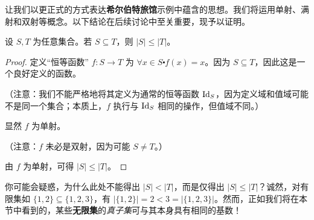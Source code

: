 让我们以更正式的方式表达\textbf{希尔伯特旅馆}示例中蕴含的思想。我们将运用单射、满射和双射等概念。以下结论在后续讨论中至关重要，现予以证明。

\begin{lemma}\label{lemma7.6.11}
    设 $S, T$ 为任意集合。若 $S \subseteq T$，则 $|S| \le |T|$。
\end{lemma}

\begin{proof}
    定义``恒等函数'' $f : S \to T$ 为 $\forall x \in S \centerdot f(x) = x$。因为 $S \subseteq T$，因此这是一个良好定义的函数。

    （注意：我们不能严格地将其定义为通常的恒等函数 $\text{Id}_S$，因为定义域和值域可能不是同一个集合；本质上，$f$ 执行与 $\text{Id}_S$ 相同的操作，但值域不同。）

    显然 $f$ 为单射。

    （注意：$f$ 未必是双射，因为可能 $S \ne T$。）

    由 $f$ 为单射，可得 $|S| \le |T|$。
\end{proof}

你可能会疑惑，为什么此处不能得出 $|S| < |T|$，而是仅得出 $|S| \le |T|$？诚然，对有限集如 $\{1, 2\} \subseteq \{1, 2, 3\}$，有 $|\{1, 2\}| = 2 < 3 = |\{1, 2, 3\}|$。然而，正如我们将在本节中看到的，某些\textbf{无限集}的\emph{真子集}可与其本身具有相同的基数！

